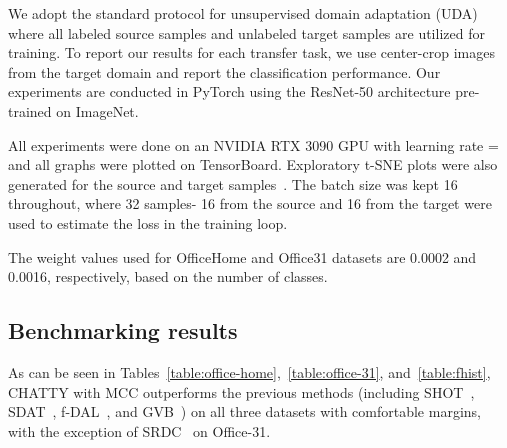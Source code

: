 \documentclass[10pt,twocolumn,letterpaper]{article}
\begin{document}
We adopt the standard protocol for unsupervised domain adaptation (UDA) where all labeled source samples and unlabeled target samples are utilized for training. To report our results for each transfer task, we use center-crop images from the target domain and report the classification performance. Our experiments are conducted in PyTorch using the ResNet-50 architecture pre-trained on ImageNet. 

All experiments were done on an NVIDIA RTX 3090 GPU with learning rate =  and all graphs were plotted on TensorBoard. Exploratory t-SNE plots were also generated for the source and target samples~\cite{tsne}. The batch size was kept 16 throughout, where 32 samples- 16 from the source and 16 from the target were used to estimate the loss in the training loop.

The weight values  used for OfficeHome and Office31 datasets are 0.0002 and 0.0016, respectively, based on the number of classes. 

\subsection{Benchmarking results}

As can be seen in Tables~\ref{table:office-home},~\ref{table:office-31}, and~\ref{table:fhist}, CHATTY with MCC outperforms the previous methods (including SHOT~\cite{shot}, SDAT~\cite{sdat}, f-DAL~\cite{fdal}, and GVB~\cite{gvb})  on all three datasets with comfortable margins, with the exception of SRDC~\cite{srdc} on Office-31.
\end{document}
